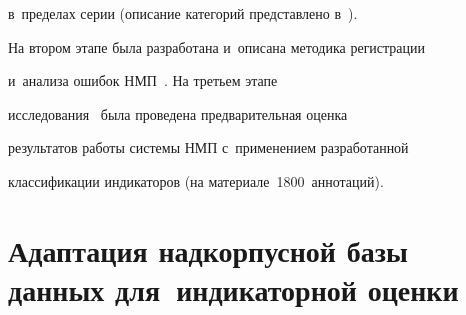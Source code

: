 в~пределах серии (описание категорий пред\-став\-ле\-но в~\cite{16-ez}).


   


   На втором этапе была разработана и~описана методика регистрации 


и~анализа ошибок НМП~\cite{6-ez}. На третьем этапе  


исследования~\cite{17-ez} была проведена предварительная оценка 


результатов работы сис\-те\-мы НМП с~применением разработанной 


классификации индикаторов (на материале~1800~аннотаций).



















   


\section{Адаптация надкорпусной базы данных для~индикаторной оценки}










